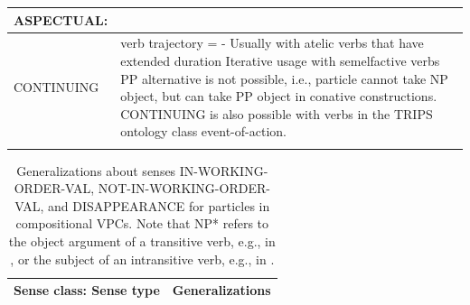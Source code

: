 \documentclass[output=paper,modfonts,nonflat]{langsci/langscibook}
\begin{document}
\begin{table}
\begin{tabularx}{\textwidth}{p{30mm}Q}
  \textbf{ASPECTUAL}:  \\
  \midrule
   CONTINUING
   & verb trajectory = - \newline Usually with atelic verbs that have extended duration \newline Iterative usage with semelfactive verbs \newline PP alternative is not possible, i.e., particle cannot take NP object, but can take PP object in conative constructions. \newline CONTINUING is also possible with verbs in the TRIPS ontology class event-of-action.\\ 
  \lspbottomrule
 \end{tabularx}%
\end{table}

\begin{table}%
\caption{Generalizations about senses IN-WORKING-ORDER-VAL, NOT-IN-WORKING-ORDER-VAL, and DISAPPEARANCE for particles in compositional VPCs. Note that NP* refers to the object argument of a transitive verb, e.g.,  in , or the subject of an intransitive verb, e.g.,  in .}
\label{tab:1:findings-prtcls-3senses}
\footnotesize
 \begin{tabularx}{\textwidth}{p{45mm}Q}
  \lsptoprule
   \textbf{Sense class}: \newline Sense type
        & Generalizations\\
    \midrule


\end{tabularx}
\end{table}
\end{document}
